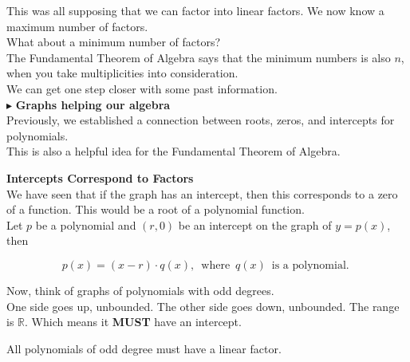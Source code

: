 \documentclass{ximera}
\begin{document}
This was all supposing that we can factor into linear factors.  We now know a maximum number of factors. \\


What about a minimum number of factors? \\

The Fundamental Theorem of Algebra says that the minimum numbers is also $n$, when you take multiplicities into consideration. \\



We can get one step closer with some past information. \\








$\blacktriangleright$ \textbf{\textcolor{blue!55!black}{Graphs helping our algebra}} \\


Previously, we established a connection between roots, zeros, and intercepts for polynomials. \\


This is also a helpful idea for the Fundamental Theorem of Algebra. \\




\begin{idea} \textbf{\textcolor{blue!55!black}{Intercepts Correspond to Factors}}   \\



We have seen that if the graph has an intercept, then this corresponds to a zero of a function.  This would be a root of a polynomial function. \\

Let $p$ be a polynomial and $(r, 0)$ be an intercept on the graph of $y = p(x)$, then 

\[
p(x) = (x-r) \cdot q(x), \, \text{ where } \, q(x) \, \text{ is a polynomial. }
\]

Now, think of graphs of polynomials with odd degrees. \\

One side goes up, unbounded.  The other side goes down, unbounded.  The range is $\mathbb{R}$.  Which means it \textbf{MUST} have an intercept.


All polynomials of odd degree must have a linear factor.




\end{idea}
\end{document}
